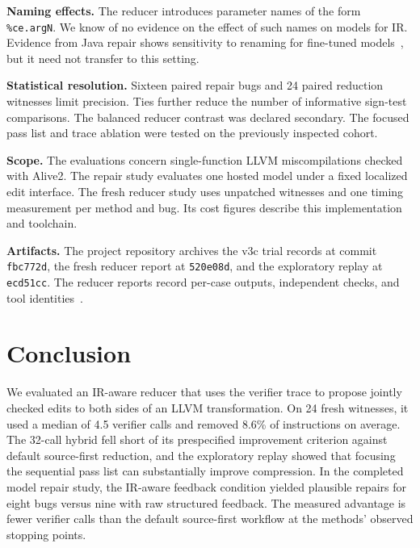 \documentclass[conference]{IEEEtran}
\begin{document}
\textbf{Naming effects.} The reducer introduces parameter names of the form \texttt{\%ce.argN}. We know of no evidence on the effect of such names on models for IR. Evidence from Java repair shows sensitivity to renaming for fine-tuned models~\cite{rabbi2026hej}, but it need not transfer to this setting.

\textbf{Statistical resolution.} Sixteen paired repair bugs and 24 paired reduction witnesses limit precision. Ties further reduce the number of informative sign-test comparisons. The balanced reducer contrast was declared secondary. The focused pass list and trace ablation were tested on the previously inspected cohort.

\textbf{Scope.} The evaluations concern single-function LLVM miscompilations checked with Alive2. The repair study evaluates one hosted model under a fixed localized edit interface. The fresh reducer study uses unpatched witnesses and one timing measurement per method and bug. Its cost figures describe this implementation and toolchain.

\textbf{Artifacts.} The project repository archives the v3c trial records at commit \texttt{fbc772d}, the fresh reducer report at \texttt{520e08d}, and the exploratory replay at \texttt{ecd51cc}. The reducer reports record per-case outputs, independent checks, and tool identities~\cite{betterCompiler2026}.

\section{Conclusion}

We evaluated an IR-aware reducer that uses the verifier trace to propose jointly checked edits to both sides of an LLVM transformation. On 24 fresh witnesses, it used a median of 4.5 verifier calls and removed 8.6\% of instructions on average. The 32-call hybrid fell short of its prespecified improvement criterion against default source-first reduction, and the exploratory replay showed that focusing the sequential pass list can substantially improve compression. In the completed model repair study, the IR-aware feedback condition yielded plausible repairs for eight bugs versus nine with raw structured feedback. The measured advantage is fewer verifier calls than the default source-first workflow at the methods' observed stopping points.



\end{document}
